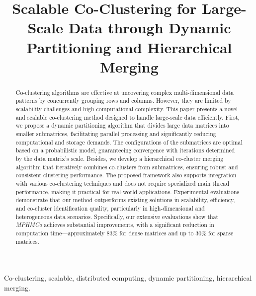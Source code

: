 \documentclass[journal]{IEEEtran}
\begin{document}
\title{\LARGE \bf Scalable Co-Clustering for Large-Scale Data through Dynamic Partitioning and Hierarchical Merging}


\author{}
\maketitle

\begin{abstract}
  Co-clustering algorithms are effective at uncovering complex multi-dimensional data patterns by concurrently grouping rows and columns. However, they are limited by scalability challenges and high computational complexity. This paper presents a novel and scalable co-clustering method designed to handle large-scale data efficiently. First, we propose a dynamic partitioning algorithm that divides large data matrices into smaller submatrices, facilitating parallel processing and significantly reducing computational and storage demands. The configurations of the submatrices are optimal based on a probabilistic model, guaranteeing convergence with iterations determined by the data matrix's scale. Besides, we develop a hierarchical co-cluster merging algorithm that iteratively combines co-clusters from submatrices, ensuring robust and consistent clustering performance. The proposed framework also supports integration with various co-clustering techniques and does not require specialized main thread performance, making it practical for real-world applications. Experimental evaluations demonstrate that our method outperforms existing solutions in scalability, efficiency, and co-cluster identification quality, particularly in high-dimensional and heterogeneous data scenarios. Specifically, our extensive evaluations show that \emph{MPHMCo} achieves substantial improvements, with a significant reduction in computation time—approximately 83\% for dense matrices and up to 30\% for sparse matrices.
\end{abstract}

\begin{IEEEkeywords}
  Co-clustering, scalable, distributed computing, dynamic partitioning, hierarchical merging.
\end{IEEEkeywords}
\end{document}
